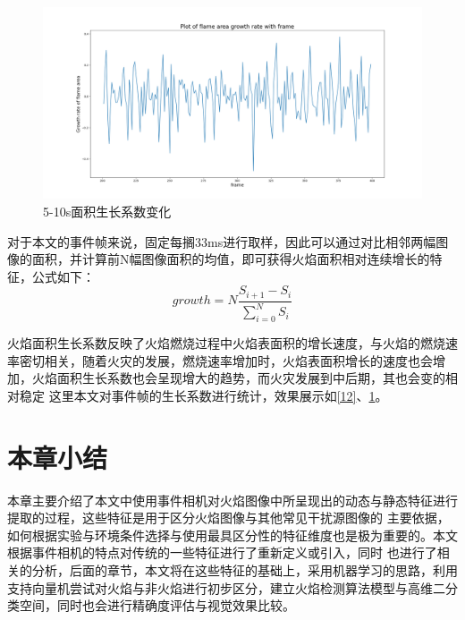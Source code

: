 \begin{figure}[ht]
        \centering
        \includegraphics[width=\textwidth]{figures/extract_area_02.png}
        \caption{5-10s面积生长系数变化}
        \label{13}
\end{figure}

对于本文的事件帧来说，固定每搁33ms进行取样，因此可以通过对比相邻两幅图像的面积，并计算前N幅图像面积的均值，即可获得火焰面积相对连续增长的特征，公式如下：
\begin{equation} 
    growth=N\frac{S_{i+1}-S_i}{\sum_{i=0}^{N}S_i}
\end{equation}

火焰面积生长系数反映了火焰燃烧过程中火焰表面积的增长速度，与火焰的燃烧速率密切相关，随着火灾的发展，燃烧速率增加时，火焰表面积增长的速度也会增加，火焰面积生长系数也会呈现增大的趋势，而火灾发展到中后期，其也会变的相对稳定
这里本文对事件帧的生长系数进行统计，效果展示如\ref{12}、\ref{13}。

\section{本章小结}
本章主要介绍了本文中使用事件相机对火焰图像中所呈现出的动态与静态特征进行提取的过程，这些特征是用于区分火焰图像与其他常见干扰源图像的
主要依据，如何根据实验与环境条件选择与使用最具区分性的特征维度也是极为重要的。本文根据事件相机的特点对传统的一些特征进行了重新定义或引入，同时
也进行了相关的分析，后面的章节，本文将在这些特征的基础上，采用机器学习的思路，利用支持向量机尝试对火焰与非火焰进行初步区分，建立火焰检测算法模型与高维二分类空间，同时也会进行精确度评估与视觉效果比较。